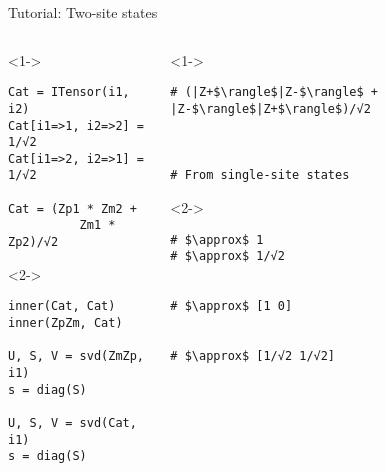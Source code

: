 \begin{frame}[fragile]{Tutorial: Two-site states}


\begin{columns}

\begin{column}{5cm}

\begin{onlyenv}<1->

\begin{lstlisting}[language=JuliaLocal, style=julia, basicstyle=\small]
Cat = ITensor(i1, i2)
Cat[i1=>1, i2=>2] = 1/√2
Cat[i1=>2, i2=>1] = 1/√2

Cat = (Zp1 * Zm2 +
          Zm1 * Zp2)/√2
\end{lstlisting}

\end{onlyenv}

\begin{onlyenv}<2->

\begin{lstlisting}[language=JuliaLocal, style=julia, basicstyle=\small]
inner(Cat, Cat)
inner(ZpZm, Cat)

U, S, V = svd(ZmZp, i1)
s = diag(S)

U, S, V = svd(Cat, i1)
s = diag(S)
\end{lstlisting}

\end{onlyenv}

\end{column}

\begin{column}{5cm}

\begin{onlyenv}<1->

\begin{lstlisting}[style=julia, numbers=none, mathescape, basicstyle=\small]
# (|Z+$\rangle$|Z-$\rangle$ + |Z-$\rangle$|Z+$\rangle$)/√2



# From single-site states
 \end{lstlisting}

\end{onlyenv}

\begin{onlyenv}<2->

\begin{lstlisting}[style=julia, numbers=none, mathescape, basicstyle=\small]
# $\approx$ 1
# $\approx$ 1/√2


# $\approx$ [1 0]


# $\approx$ [1/√2 1/√2]
\end{lstlisting}

\end{onlyenv}

\end{column}

\end{columns}

\end{frame}
